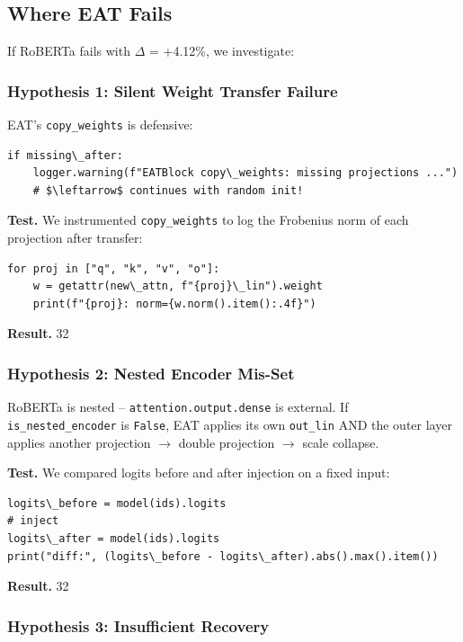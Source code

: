 \subsection{Where EAT Fails}

If RoBERTa fails with $\Delta$ = +4.12\%, we investigate:

\subsubsection{Hypothesis 1: Silent Weight Transfer Failure}

EAT's \texttt{copy\_weights} is defensive:

\begin{lstlisting}
if missing\_after:
    logger.warning(f"EATBlock copy\_weights: missing projections ...")
    # $\leftarrow$ continues with random init!
\end{lstlisting}

\textbf{Test.} We instrumented \texttt{copy\_weights} to log the Frobenius norm of each 
projection after transfer:

\begin{lstlisting}
for proj in ["q", "k", "v", "o"]:
    w = getattr(new\_attn, f"{proj}\_lin").weight
    print(f"{proj}: norm={w.norm().item():.4f}")
\end{lstlisting}

\textbf{Result.} 32

\subsubsection{Hypothesis 2: Nested Encoder Mis-Set}

RoBERTa is nested -- \texttt{attention.output.dense} is external. If 
\texttt{is\_nested\_encoder} is \texttt{False}, EAT applies its own \texttt{out\_lin} AND the 
outer layer applies another projection $\to$ double projection $\to$ scale collapse.

\textbf{Test.} We compared logits before and after injection on a fixed input:

\begin{lstlisting}
logits\_before = model(ids).logits
# inject
logits\_after = model(ids).logits
print("diff:", (logits\_before - logits\_after).abs().max().item())
\end{lstlisting}

\textbf{Result.} 32

\subsubsection{Hypothesis 3: Insufficient Recovery}

